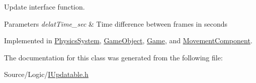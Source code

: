 Update interface function. 


\begin{DoxyParams}{Parameters}
{\em delat\+Time\+\_\+sec} & Time difference between frames in seconds \\
\hline
\end{DoxyParams}


Implemented in \mbox{\hyperlink{class_physics_system_aabb107eb3795556bff83099d7f3cb710}{Physics\+System}}, \mbox{\hyperlink{class_game_object_a931541422ec57567e1d46436d97b874c}{Game\+Object}}, \mbox{\hyperlink{class_game_a49cc5bc8eee98577d72cd49dfc3c4af5}{Game}}, and \mbox{\hyperlink{class_movement_component_ae366501e0dbaf79deaab508cf5a0b86e}{Movement\+Component}}.



The documentation for this class was generated from the following file\+:\begin{DoxyCompactItemize}
\item 
Source/\+Logic/\mbox{\hyperlink{_i_updatable_8h}{I\+Updatable.\+h}}\end{DoxyCompactItemize}
